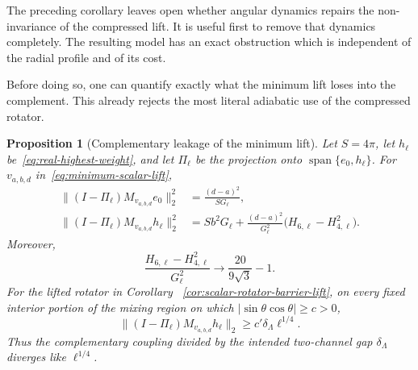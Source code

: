 \documentclass[11pt]{article}
\newtheorem{proposition}[theorem]{Proposition}
\theoremstyle{definition}
\theoremstyle{remark}
\begin{document}
The preceding corollary leaves open whether angular dynamics repairs the
non-invariance of the compressed lift.  It is useful first to remove that
dynamics completely.  The resulting model has an exact obstruction which is
independent of the radial profile and of its cost.

Before doing so, one can quantify exactly what the minimum lift loses into the
complement.  This already rejects the most literal adiabatic use of the
compressed rotator.

\begin{proposition}[Complementary leakage of the minimum lift]
\label{prop:minimum-lift-complement-leakage}
Let $S=4\pi$, let $h_\ell$ be~\eqref{eq:real-highest-weight}, and let
$\Pi_\ell$ be the projection onto $\operatorname{span}\{e_0,h_\ell\}$.  For
$v_{a,b,d}$ in~\eqref{eq:minimum-scalar-lift},
\begin{align}
 \|(I-\Pi_\ell)M_{v_{a,b,d}}e_0\|_2^2
 &=\frac{(d-a)^2}{S G_\ell},
 \label{eq:minimum-lift-low-leakage}\\
 \|(I-\Pi_\ell)M_{v_{a,b,d}}h_\ell\|_2^2
 &=S b^2G_\ell
   +\frac{(d-a)^2}{G_\ell^2}
      \bigl(H_{6,\ell}-H_{4,\ell}^2\bigr).
 \label{eq:minimum-lift-high-leakage}
\end{align}
Moreover,
\begin{equation}
 \frac{H_{6,\ell}-H_{4,\ell}^2}{G_\ell^2}
 \longrightarrow \frac{20}{9\sqrt3}-1.
 \label{eq:minimum-lift-diagonal-leakage-limit}
\end{equation}
For the lifted rotator in Corollary
~\ref{cor:scalar-rotator-barrier-lift}, on every fixed interior portion of the
mixing region on which $|\sin\theta\cos\theta|\geq c>0$,
\begin{equation}
 \|(I-\Pi_\ell)M_{v_{a,b,d}}h_\ell\|_2
 \geq c'\delta_\Lambda\ell^{1/4}.
 \label{eq:minimum-lift-gap-failure}
\end{equation}
Thus the complementary coupling divided by the intended two-channel gap
$\delta_\Lambda$ diverges like $\ell^{1/4}$.
\end{proposition}
\end{document}
